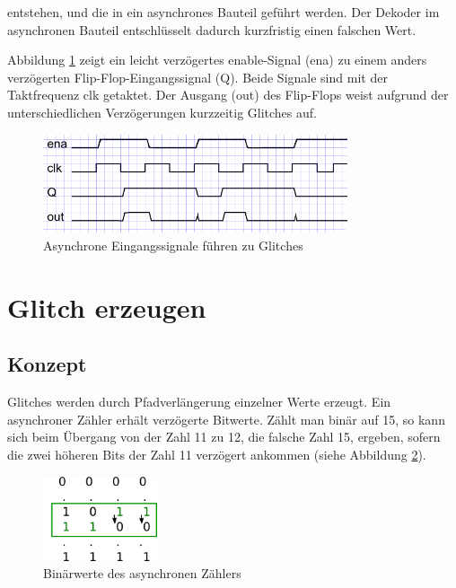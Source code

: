 entstehen, und die in ein asynchrones Bauteil geführt werden. Der Dekoder im asynchronen Bauteil entschlüsselt dadurch kurzfristig einen falschen Wert.

Abbildung \ref{fig.glitch.bild1} zeigt ein leicht verzögertes enable-Signal (ena) zu einem anders verzögerten Flip-Flop-Eingangssignal (Q). Beide Signale sind mit der Taktfrequenz clk getaktet. Der Ausgang (out) des Flip-Flops weist aufgrund der unterschiedlichen Verzögerungen kurzzeitig Glitches auf.

\begin{figure}[H]
	\includegraphics[width=0.8\textwidth]{images/glitch/def_glitch_3.png}
	\caption{Asynchrone Eingangssignale führen zu Glitches}
	\label{fig.glitch.bild1}
\end{figure}


\newpage
\section{Glitch erzeugen}\label{sect.glitch_detect}


\subsection{Konzept}
Glitches werden durch Pfadverlängerung einzelner Werte erzeugt. Ein asynchroner Zähler erhält verzögerte Bitwerte. Zählt man binär auf 15, so kann sich beim Übergang von der Zahl 11 zu 12, die falsche Zahl 15, ergeben, sofern die zwei höheren Bits der Zahl 11 verzögert ankommen (siehe Abbildung \ref {fig.glitch.binaer_zahlen}).

\begin{figure}[H]
	\includegraphics[width=0.3\textwidth]{images/glitch/konzept_verzoegerung.png}
	\caption{Binärwerte des asynchronen Zählers}
	\label{fig.glitch.binaer_zahlen}
\end{figure}

